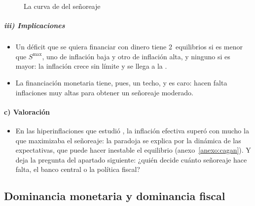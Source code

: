 \documentclass[11pt]{article}
\begin{document}
\begin{figure}[H]
\centering
\caption{La curva de  del señoreaje}\label{fig:laffer-senoreaje}
\end{figure}

\subparagraph{iii) Implicaciones}

\begin{itemize}
\item Un déficit que se quiera financiar con dinero tiene 2~equilibrios si es menor que $S^{\max}$, uno de inflación baja y otro de inflación alta, y ninguno si es mayor: la inflación crece sin límite y se llega a la .
\item La financiación monetaria tiene, pues, un techo, y es caro: hacen falta inflaciones muy altas para obtener un señoreaje moderado.
\end{itemize}

\paragraph{c) Valoración}

\begin{itemize}
\item En las hiperinflaciones que estudió , la inflación efectiva superó con mucho la que maximizaba el señoreaje: la paradoja se explica por la dinámica de las expectativas, que puede hacer inestable el equilibrio (anexo~\ref{anexo:cagan}). Y deja la pregunta del apartado siguiente: ¿quién decide cuánto señoreaje hace falta, el banco central o la política fiscal?
\end{itemize}

\subsection{Dominancia monetaria y dominancia fiscal}\label{sec:dominacion-fiscal}
\end{document}
